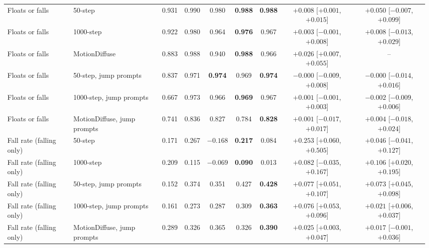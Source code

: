 \begin{tabular}{llccccccc}
\addlinespace[2pt]
Floats or falls & 50-step & 0.931 & 0.990 & 0.980 & \textbf{0.988} & \textbf{0.988} & $+0.008$ [$+0.001$, $+0.015$] & $+0.050$ [$-0.007$, $+0.099$] \\
Floats or falls & 1000-step & 0.922 & 0.980 & 0.964 & \textbf{0.976} & 0.967 & $+0.003$ [$-0.001$, $+0.008$] & $+0.008$ [$-0.013$, $+0.029$] \\
Floats or falls & MotionDiffuse & 0.883 & 0.988 & 0.940 & \textbf{0.988} & 0.966 & $+0.026$ [$+0.007$, $+0.055$] & -- \\
Floats or falls & 50-step, jump prompts & 0.837 & 0.971 & \textbf{0.974} & 0.969 & \textbf{0.974} & $-0.000$ [$-0.009$, $+0.008$] & $-0.000$ [$-0.014$, $+0.016$] \\
Floats or falls & 1000-step, jump prompts & 0.667 & 0.973 & 0.966 & \textbf{0.969} & 0.967 & $+0.001$ [$-0.001$, $+0.003$] & $-0.002$ [$-0.009$, $+0.006$] \\
Floats or falls & MotionDiffuse, jump prompts & 0.741 & 0.836 & 0.827 & 0.784 & \textbf{0.828} & $+0.001$ [$-0.017$, $+0.017$] & $+0.004$ [$-0.018$, $+0.024$] \\
\addlinespace[2pt]
Fall rate (falling only) & 50-step & 0.171 & 0.267 & $-0.168$ & \textbf{0.217} & 0.084 & $+0.253$ [$+0.060$, $+0.505$] & $+0.046$ [$-0.041$, $+0.127$] \\
Fall rate (falling only) & 1000-step & 0.209 & 0.115 & $-0.069$ & \textbf{0.090} & 0.013 & $+0.082$ [$-0.035$, $+0.167$] & $+0.106$ [$+0.020$, $+0.195$] \\
Fall rate (falling only) & 50-step, jump prompts & 0.152 & 0.374 & 0.351 & 0.427 & \textbf{0.428} & $+0.077$ [$+0.051$, $+0.107$] & $+0.073$ [$+0.045$, $+0.098$] \\
Fall rate (falling only) & 1000-step, jump prompts & 0.161 & 0.273 & 0.287 & 0.309 & \textbf{0.363} & $+0.076$ [$+0.053$, $+0.096$] & $+0.021$ [$+0.006$, $+0.037$] \\
Fall rate (falling only) & MotionDiffuse, jump prompts & 0.289 & 0.326 & 0.365 & 0.326 & \textbf{0.390} & $+0.025$ [$+0.003$, $+0.047$] & $+0.017$ [$-0.001$, $+0.036$] \\
\bottomrule
\end{tabular}
